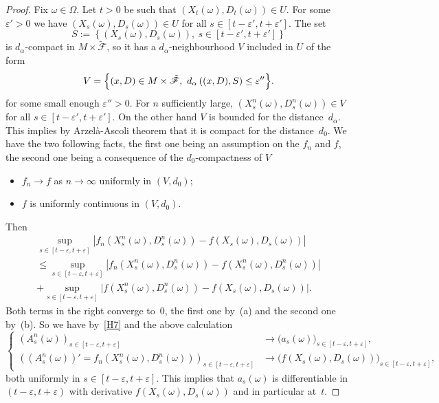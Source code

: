 \documentclass[JEP,XML,SOM,Unicode,NoFloatCountersInSection,published]{cedram}
\theoremstyle{plain}
\theoremstyle{definition}
\newcommand{\SF}{{\mathscr F}}
\let\di\displaystyle
\let\a\alpha
\let\e\varepsilon
\let\Om\Omega
\let\om\omega
\begin{document}
\begin{proof}
Fix $\om\in \Om$. Let $t>0$ be such that $(X_t(\om), D_t(\om))\in U$. For some $\e'>0$ we have $(X_s(\om), D_s(\om))\in U$ for all $s\in [t-\e', t+\e']$. The set
\begin{equation}
S:=\left\{\left(X_s(\om), D_s(\om)\right), \ s\in [t-\e', t+\e'] \right\}
\end{equation}
is $d_\a$-compact in $M\times \tilde \SF$, so it has a $d_\a$-neighbourhood $V$ included in $U$ of the form
\begin{equation}
V=\Bigl\{(x,D)\in M\times \tilde\SF, \ d_\a\left( (x,D),S\right)\le \e'' \Bigr\}.
\end{equation}
for some small enough $ \e''>0$.
For $n$ sufficiently large, $\di \left(X_s^n(\om), D_s^n(\om)\right)\in V$ for all $s\in [t-\e', t+\e']$.
On the other hand $V$ is bounded for the distance~$d_\a$. This implies by Arzelà-Ascoli theorem that it is compact for the distance~$d_0$.
We have the two following facts, the first one being an assumption on the $f_n$ and $f$, the second one being a consequence of the $d_0$-compactness of $V$
\begin{itemize}
\item[(a)] $f_n\to f$ as $n\to\infty$ uniformly in $(V,d_0)$;
\item[(b)] $f$ is uniformly continuous in $(V,d_0)$.
\end{itemize}
Then\vspace*{-8pt}
\begin{multline*}
\sup_{s\in[t-\e,t+\e]}\left|f_n(X_s^n(\om),D_s^n(\om))-f(X_s(\om),D_s(\om))\right|\\[-3pt]
\le \sup_{s\in[t-\e,t+\e]}\left|f_n(X_s^n(\om),D_s^n(\om))-f(X_s^n(\om),D_s^n(\om))\right|\\[-3pt]
+\sup_{s\in[t-\e,t+\e]}\bigl|f(X_s^n(\om),D_s^n(\om))-f(X_s(\om),D_s(\om))\bigr|.
\end{multline*}
Both terms in the right converge to~$0$, the first one by~(a) and the second one by~(b).
So we have by~\eqref{H7} and the above calculation\vspace*{-3pt}
\begin{equation}
\left\{\begin{aligned}
\left(A_s^n(\om)\right)_{s\in[t-\e,t+\e]}&\rightarrow \bigl(a_s(\om)\bigr)_{s\in[t-\e,t+\e]},\\
\left((A_s^n(\om))'\!=\!f_n(X_s^n(\om), D_s^n(\om))\right)_{s\in[t-\e,t+\e]}&\rightarrow \bigl(f(X_s(\om), D_s(\om))\bigr)_{s\in[t-\e,t+\e]},
\end{aligned}\right.
\end{equation}
both uniformly in $s\in[t-\e,t+\e]$. This implies that $a_s(\om)$ is differentiable in $(t-\e, t+\e)$ with derivative $f(X_s(\om), D_s(\om))$ and in particular at~$t$.


\end{proof}
\end{document}
